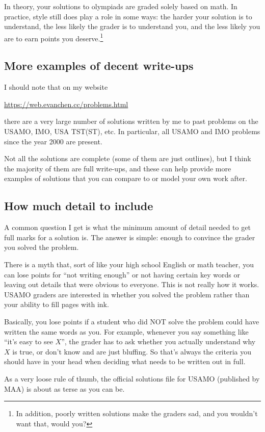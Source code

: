 \documentclass[11pt]{scrartcl}
\begin{document}
In theory, your solutions to olympiads are graded solely based on math.
In practice, style still does play a role in some ways:
the harder your solution is to understand,
the less likely the grader is to understand you,
and the less likely you are to earn points you deserve.\footnote{In addition,
  poorly written solutions make the graders sad, and you wouldn't want that, would you?}

\subsection{More examples of decent write-ups}
I should note that on my website
\begin{center}
  \url{https://web.evanchen.cc/problems.html}
\end{center}
there are a very large number of solutions written by me
to past problems on the USAMO, IMO, USA TST(ST), etc.
In particular, all USAMO and IMO problems since the year 2000
are present.

Not all the solutions are complete
(some of them are just outlines),
but I think the majority of them are full write-ups,
and these can help provide more examples of solutions
that you can compare to or model your own work after.

\subsection{How much detail to include}
A common question I get is what the minimum amount of detail needed
to get full marks for a solution is.
The answer is simple: enough to convince the grader you solved the problem.

There is a myth that, sort of like your high school English or math teacher,
you can lose points for ``not writing enough'' or not having certain key words
or leaving out details that were obvious to everyone.
This is not really how it works.
USAMO graders are interested in whether you solved the problem
rather than your ability to fill pages with ink.

Basically, \alert{you lose points if a student who did NOT solve the problem
could have written the same words as you}.
For example, whenever you say something like ``it's easy to see $X$'',
the grader has to ask whether you actually understand why $X$ is true,
or don't know and are just bluffing.
So that's always the criteria you should have in your head
when deciding what needs to be written out in full.

As a very loose rule of thumb,
the official solutions file for USAMO (published by MAA)
is about as terse as you can be.
\end{document}
